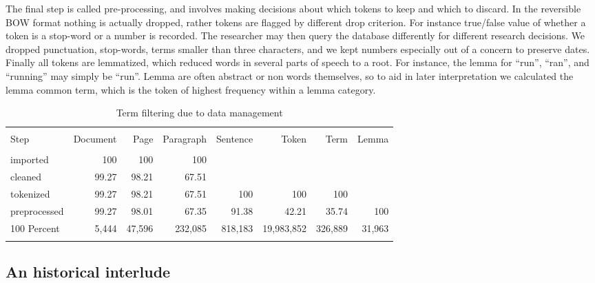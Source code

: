 \documentclass[]{book}
\theoremstyle{definition}
\theoremstyle{definition}
\theoremstyle{definition}
\theoremstyle{remark}
\begin{document}
The final step is called pre-processing, and involves making decisions
about which tokens to keep and which to discard. In the reversible BOW
format nothing is actually dropped, rather tokens are flagged by
different drop criterion. For instance true/false value of whether a
token is a stop-word or a number is recorded. The researcher may then
query the database differently for different research decisions. We
dropped punctuation, stop-words, terms smaller than three characters,
and we kept numbers especially out of a concern to preserve dates.
Finally all tokens are lemmatized, which reduced words in several parts
of speech to a root. For instance, the lemma for ``run'', ``ran'', and
``running'' may simply be ``run''. Lemma are often abstract or non words
themselves, so to aid in later interpretation we calculated the lemma
common term, which is the token of highest frequency within a lemma
category.

\begin{table}[!htbp] \centering 
  \caption{Term filtering due to data management} 
  \label{tab:filt} 
\small 
\begin{tabular}{@{\extracolsep{5pt}} lrrrrrrr} 
\\[-1.8ex]\hline 
\hline \\[-1.8ex] 
Step & Document & Page & Paragraph & Sentence & Token & Term & Lemma \\ 
\hline \\[-1.8ex] 
imported & 100 & 100 & 100 &  &  &  &  \\ 
cleaned & 99.27 & 98.21 & 67.51 &  &  &  &  \\ 
tokenized & 99.27 & 98.21 & 67.51 & 100 & 100 & 100 &  \\ 
preprocessed & 99.27 & 98.01 & 67.35 & 91.38 & 42.21 & 35.74 & 100 \\ 
100 Percent & 5,444 & 47,596 & 232,085 & 818,183 & 19,983,852 & 326,889 & 31,963 \\ 
\hline \\[-1.8ex] 
\end{tabular} 
\end{table}

\hypertarget{an-historical-interlude}{%
\subsection{An historical interlude}\label{an-historical-interlude}}
\end{document}
